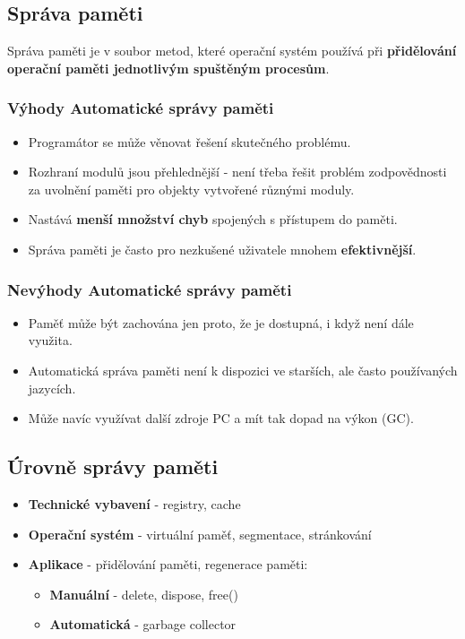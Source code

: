 \subsection{Správa paměti}
Správa paměti je v soubor metod, které operační systém používá při \textbf{přidělování operační paměti jednotlivým spuštěným procesům}.

\subsubsection*{Výhody Automatické správy paměti}
\begin{itemize}
\item Programátor se může věnovat řešení skutečného problému.
\item Rozhraní modulů jsou přehlednější - není třeba řešit problém zodpovědnosti za uvolnění paměti pro objekty vytvořené různými moduly.
\item Nastává \textbf{menší množství chyb} spojených s přístupem do paměti.
\item Správa paměti je často pro nezkušené uživatele mnohem \textbf{efektivnější}.
\end{itemize}

\subsubsection*{Nevýhody Automatické správy paměti}
\begin{itemize}
\item Paměť může být zachována jen proto, že je dostupná, i když není dále využita.
\item Automatická správa paměti není k dispozici ve starších, ale často používaných jazycích.
\item Může navíc využívat další zdroje PC a mít tak dopad na výkon (GC).
\end{itemize}

\subsection{Úrovně správy paměti}
\begin{itemize}
	\item \textbf{Technické vybavení} - registry, cache
	\item \textbf{Operační systém} - virtuální paměť, segmentace, stránkování
	\item \textbf{Aplikace} - přidělování paměti, regenerace paměti:
	\begin{itemize}
		\item \textbf{Manuální} - delete, dispose, free()
		\item \textbf{Automatická} - garbage collector
	\end{itemize}
\end{itemize}

